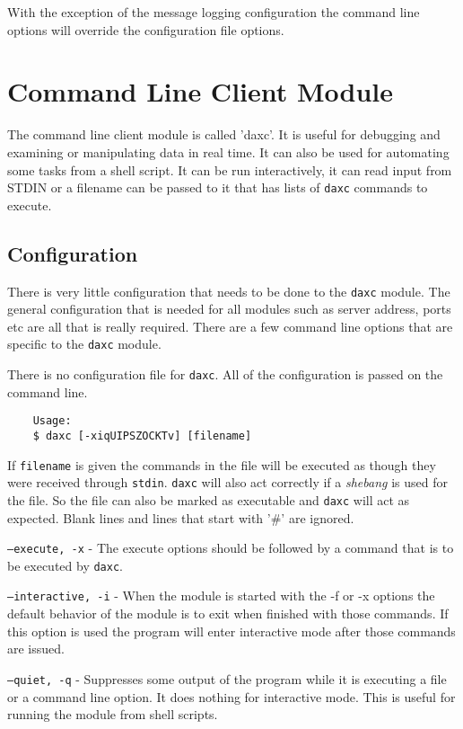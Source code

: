 	With the exception of the message logging configuration the command line options
	will override the configuration file options.

	\chapter{Command Line Client Module}
	The command line client module is called 'daxc'.  It is useful for debugging and
	examining or manipulating \opendax{} data in real time.  It can also be used for
	automating some \opendax{} tasks from a shell script.  It can be run interactively,
	it can read input from STDIN or a filename can be passed to it that has lists of
	\texttt{daxc} commands to execute.

	\section{Configuration}
	There is very little configuration that needs to be done to the \texttt{daxc}
	module.  The general configuration that is needed for all modules such as server
	address, ports etc are all that is really required.  There are a few command
	line options that are specific to the \texttt{daxc} module.

	There is no configuration file for \texttt{daxc}.  All of the configuration is
	passed on the command line.

	\begin{verbatim}
	Usage:
	$ daxc [-xiqUIPSZOCKTv] [filename]
	\end{verbatim}

	If \texttt{filename} is given the commands in the file will be executed as
	though
	they were received through \texttt{stdin}.  \texttt{daxc} will also act
	correctly if a \textit{shebang} is used for the file.  So the file can also be
	marked as executable and \texttt{daxc} will act as expected.  Blank lines and
	lines that start with '\#' are ignored.

	\begin{list}{}{daxc Command Line Options}
		\item[\texttt{--execute, -x}] - The execute options should be followed by a command
		that is to be executed by \texttt{daxc}.
		\item[\texttt{--interactive, -i}] - When the module is started with the -f or -x
		options the default behavior of the module is to exit when finished with those
		commands.  If this option is used the program will enter interactive mode after
		those commands are issued.
		\item[\texttt{--quiet, -q}] - Suppresses some output of the program while it is
		executing a file or a command line option.  It does nothing for interactive
		mode.  This is useful for running the module from shell scripts.
	\end{list}

